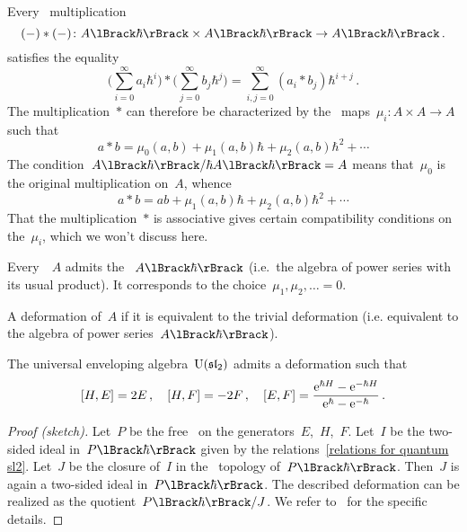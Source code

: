 \documentclass[a4paper, 11pt, oneside]{scrartcl}
\begin{document}
\begin{remark}
  Every~\bilinear{$\kfhbar$} multiplication
  \[
    (-) * (-)
    \colon
    \power{A}{\hbar} \times \power{A}{\hbar}
    \to
    \power{A}{\hbar} \,.
  \]
  satisfies the equality
  \[
    \Biggl( \sum_{i=0}^\infty a_i \hbar^i \Biggr)
    *
    \Biggl( \sum_{j=0}^\infty b_j \hbar^j \Biggr)
    =
    \sum_{i,j = 0}^\infty (a_i * b_j) \hbar^{i+j} \,.
  \]
  The multiplication~$*$ can therefore be characterized by the~\bilinear{$\kf$} maps~$\mu_i \colon A \times A \to A$ such that
  \[
    a * b
    =
    \mu_0(a, b) + \mu_1(a, b) \hbar + \mu_2(a, b) \hbar^2 + \dotsb
  \]
  The condition~$\power{A}{\hbar} / \hbar \power{A}{\hbar} = A$ means that~$\mu_0$ is the original multiplication on~$A$, whence
  \[
    a * b
    =
    ab + \mu_1(a, b) \hbar + \mu_2(a, b) \hbar^2 + \dotsb
  \]
  That the multiplication~$*$ is associative gives certain compatibility conditions on the~$\mu_i$, which we won’t discuss here.
\end{remark}

\begin{example}
  Every~\algebra{$\kf$}~$A$ admits the ~$\power{A}{\hbar}$ (i.e.\ the algebra of power series with its usual product).
  It corresponds to the choice~$\mu_1, \mu_2, \dotsc = 0$.

  A deformation of~$A$  if it is equivalent to the trivial deformation (i.e. equivalent to the algebra of power series~$\power{A}{\hbar}$).
\end{example}

\begin{theorem}
  \label{existence of Uhsl2}
  The universal enveloping algebra~$\operatorname{U}(\mathfrak{sl}_2)$ admits a deformation such that 
  \begin{equation}
    \label{relations for quantum sl2}
    [H, E] = 2E \,,
    \quad
    [H, F] = -2F \,,
    \quad
    [E, F]
    =
    \frac{ \mathrm{e}^{\hbar H} - \mathrm{e}^{-\hbar H} }{ \mathrm{e}^{\hbar} - \mathrm{e}^{-\hbar} } \,.
  \end{equation}
\end{theorem}

\begin{proof}[Proof (sketch)]
  Let~$P$ be the free~\algebra{$\kf$} on the generators~$E$,~$H$,~$F$.
  Let~$I$ be the two-sided ideal in~$\power{P}{\hbar}$ given by the relations~\eqref{relations for quantum sl2}.
  Let~$J$ be the closure of~$I$ in the~\adic{$\hbar$} topology of~$\power{P}{\hbar}$.
  Then~$J$ is again a two-sided ideal in~$\power{P}{\hbar}$.
  The described deformation can be realized as the quotient~$\power{P}{\hbar} / J$.
  We refer to~\cite[Definition-Proposition~6.4.3~ff.]{guide_to_quantum_groups} for the specific details.
\end{proof}
\end{document}
